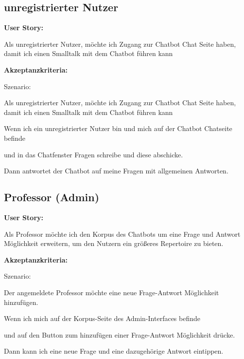 \subsection{unregistrierter Nutzer}

\textbf{User Story:}
\newline

\noindent Als unregistrierter Nutzer,
möchte ich Zugang zur Chatbot Chat Seite haben,
damit ich einen Smalltalk mit dem Chatbot führen kann
\newline

\noindent \textbf{Akzeptanzkriteria:}
\newline

\noindent Szenario: 

\noindent Als unregistrierter Nutzer,
möchte ich Zugang zur Chatbot Chat Seite haben,
damit ich einen Smalltalk mit dem Chatbot führen kann
\newline

\noindent Wenn ich ein unregistrierter Nutzer bin und mich auf der Chatbot Chatseite befinde

\noindent und in das Chatfenster Fragen schreibe und diese abschicke.

\noindent Dann antwortet der Chatbot auf meine Fragen mit allgemeinen Antworten.

\subsection{Professor (Admin)}

\textbf{User Story:}
\newline

\noindent Als Professor möchte ich den Korpus des Chatbots 
um eine Frage und Antwort Möglichkeit erweitern, 
um den Nutzern ein größeres Repertoire zu bieten.
\newline

\noindent \textbf{Akzeptanzkriteria:}
\newline

\noindent Szenario: 

\noindent Der angemeldete Professor möchte eine neue Frage-Antwort Möglichkeit hinzufügen.
\newline

\noindent Wenn ich mich auf der Korpus-Seite des Admin-Interfaces befinde

\noindent und auf den Button zum hinzufügen einer Frage-Antwort Möglichkeit drücke.

\noindent Dann kann ich eine neue Frage und eine dazugehörige Antwort eintippen.




